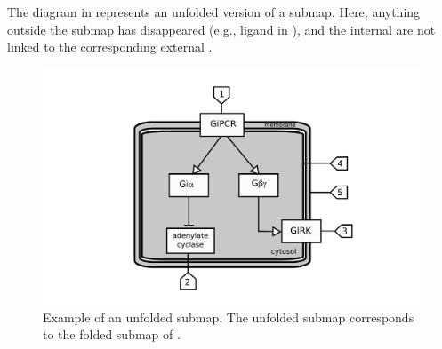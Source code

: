 The diagram in  represents an unfolded version of a submap.  Here, anything outside the submap has disappeared (e.g., ligand in ), and the internal  are not linked to the corresponding external .

\begin{figure}[H]
  \centering
  \includegraphics[scale = 0.5]{examples/submap-dissociated.pdf}
  \caption{Example of an unfolded submap. The unfolded submap corresponds to the folded submap of .}
  \label{fig:submap-unfolded}
\end{figure}
